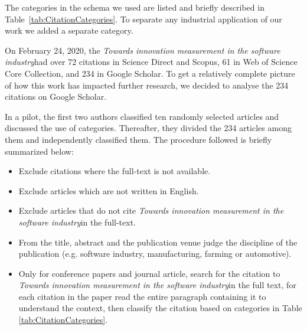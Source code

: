 \documentclass[sigplan]{acmart}
\newcommand{\theArticle}{\textit{Towards innovation measurement in the software industry}}
\begin{document}
The categories in the schema we used are listed and briefly described in Table~\ref{tab:CitationCategories}. To separate any industrial application of our work we added a separate category. 

On February 24, 2020, the \theArticle  had over 72 citations in Science Direct and Scopus, 61 in Web of Science Core Collection, and 234 in Google Scholar. To get a relatively complete picture of how this work has impacted further research, we decided to analyse the 234 citations on Google Scholar. 

In a pilot, the first two authors classified ten randomly selected articles and discussed the use of categories. Thereafter, they divided the 234 articles among them and  independently classified them. The procedure followed is briefly summarized below: 
\begin{itemize}
\item Exclude citations where the full-text is not available. 
\item Exclude articles which are not written in English.
\item Exclude articles  that do not cite \theArticle in the full-text.
\item From the title, abstract and the publication venue judge the discipline of the publication (e.g. software industry, manufacturing, farming or automotive).
\item Only for conference papers and journal article, search for the citation to \theArticle in the full text, for each citation in the paper  read the entire paragraph containing it to understand the context, then classify the citation based on categories in Table \ref{tab:CitationCategories}.
\end{itemize}
 
\end{document}

